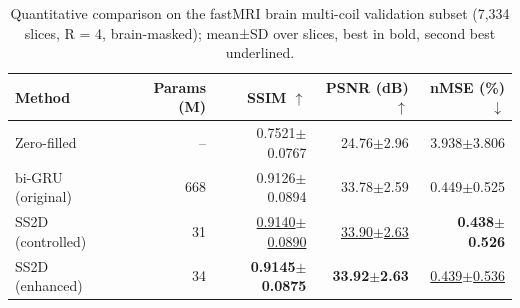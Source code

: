 \begin{table}[ht]
\centering
\caption{Quantitative comparison on the fastMRI brain multi-coil validation subset (7,334 slices, R = 4, brain-masked); mean±SD over slices, best in bold, second best underlined.}
\label{tab:main-slice}
\begin{tabular}{lrrrr}
\toprule
Method & Params (M) & SSIM $\uparrow$ & PSNR (dB) $\uparrow$ & nMSE (\%) $\downarrow$ \\
\midrule
Zero-filled & -- & 0.7521$\pm$0.0767 & 24.76$\pm$2.96 & 3.938$\pm$3.806 \\
bi-GRU (original) & 668 & 0.9126$\pm$0.0894 & 33.78$\pm$2.59 & 0.449$\pm$0.525 \\
SS2D (controlled) & 31 & \underline{0.9140$\pm$0.0890} & \underline{33.90$\pm$2.63} & \textbf{0.438$\pm$0.526} \\
SS2D (enhanced) & 34 & \textbf{0.9145$\pm$0.0875} & \textbf{33.92$\pm$2.63} & \underline{0.439$\pm$0.536} \\
\bottomrule
\end{tabular}
\end{table}
